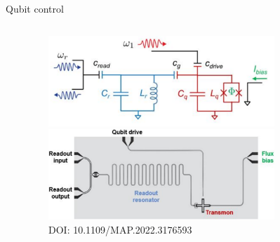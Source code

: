 \documentclass[aspectratio=169,10pt]{beamer}
\begin{document}
\begin{frame}{Qubit control}
\begin{columns}
\begin{column}{0.45\textwidth}
    \end{column}
    \begin{column}{0.55\textwidth}
      \centering
      \begin{figure}
        \centering
        \vspace{2mm}
        \includegraphics[width=0.8\textwidth]{figures/TransmonCircuit.png}\\
        \vspace{1.5em}
        \includegraphics[width=0.8\textwidth]{figures/TransmonBoard.png}\\
        {\tiny DOI: 10.1109/MAP.2022.3176593}
      \end{figure}
    \end{column}
  \end{columns}   


\end{frame}
\end{document}
